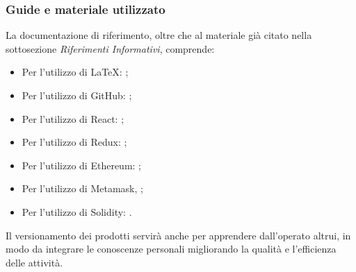 \documentclass[NormeDiProgetto.tex]{subfiles}
\begin{document}
	\subsubsection{Guide e materiale utilizzato}
	 La documentazione di riferimento, oltre che al materiale già citato nella sottosezione \emph{Riferimenti Informativi}, comprende:\\
	\begin{itemize}
		\item Per l'utilizzo di \LaTeX: ;\\
		\item Per l'utilizzo di GitHub: ;\\
		\item Per l'utilizzo di React: ;\\
		\item Per l'utilizzo di Redux: ;\\
		\item Per l'utilizzo di Ethereum: ;\\
		\item Per l'utilizzo di Metamask, ;\\ 
		\item Per l'utilizzo di Solidity: .\\
	\end{itemize}
	Il versionamento dei prodotti servirà anche per apprendere dall'operato
	altrui, in modo da integrare le conoscenze personali migliorando la qualità e
	l'efficienza delle attività.
	
\end{document}
